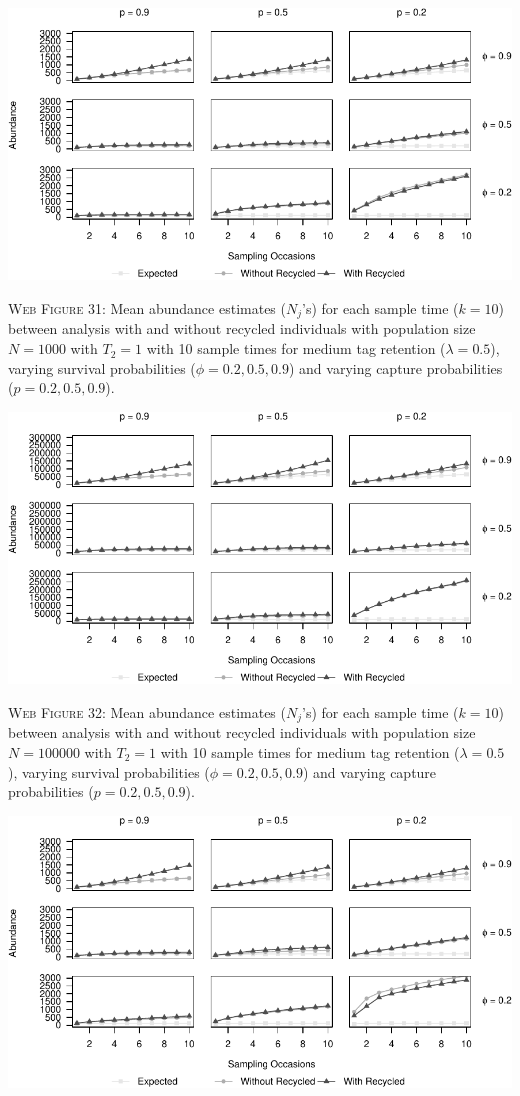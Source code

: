 \documentclass[]{article}
\begin{document}
\newpage

\includegraphics{Appendix_BW_files/figure-latex/31_abundance_M_GJSTL1-1.pdf}

\textsc{Web Figure 31:} Mean abundance estimates (\(N_j\)'s) for each
sample time (\(k=10\)) between analysis with and without recycled
individuals with population size \(N=1000\) with \(T_2=1\) with 10 sample times
for medium tag retention (\(\lambda=0.5\)), varying survival
probabilities (\(\phi=0.2,0.5,0.9\)) and varying capture probabilities
(\(p=0.2,0.5,0.9\)).

\includegraphics{Appendix_BW_files/figure-latex/32_abundance_M_GJSTL2-1.pdf}

\textsc{Web Figure 32:} Mean abundance estimates (\(N_j\)'s) for each
sample time (\(k=10\)) between analysis with and without recycled
individuals with population size \(N=100000\) with \(T_2=1\) with 10
sample times for medium tag retention (\(\lambda=0.5\)), varying
survival probabilities (\(\phi=0.2,0.5,0.9\)) and varying capture
probabilities (\(p=0.2,0.5,0.9\)).

\newpage

\includegraphics{Appendix_BW_files/figure-latex/33_abundance_M_GJSTL4-1.pdf}
\end{document}
